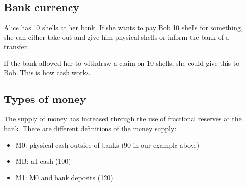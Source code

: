 
\subsection{Bank currency}

Alice has 10 shells at her bank. If she wants to pay Bob 10 shells for something, she can either take out and give him physical shells or inform the bank of a transfer.

If the bank allowed her to withdraw a claim on 10 shells, she could give this to Bob. This is how cash works.

\subsection{Types of money}

The supply of money has increased through the use of fractional reserves at the bank. There are different definitions of the money supply:

\begin{itemize}
\item M0: physical cash outside of banks (90 in our example above)
\item MB: all cash (100)
\item M1: M0 and bank deposits (120)
\end{itemize}

